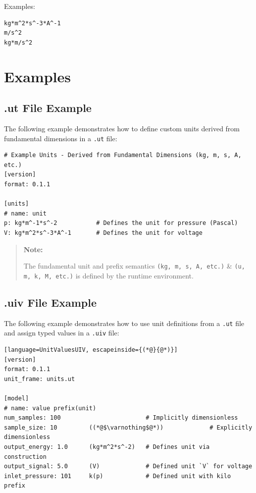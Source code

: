 \documentclass[11pt]{article}
\begin{document}
Examples:

\begin{lstlisting}[language=UnitValuesUT]
kg*m^2*s^-3*A^-1
m/s^2
kg*m/s^2
\end{lstlisting}

\section{Examples}

\subsection{.ut File Example}

The following example demonstrates how to define custom units derived from
fundamental dimensions in a \texttt{.ut} file:

\begin{lstlisting}[language=UnitValuesUT]
# Example Units - Derived from Fundamental Dimensions (kg, m, s, A, etc.)
[version]
format: 0.1.1
 
[units]
# name: unit
p: kg*m^-1*s^-2           # Defines the unit for pressure (Pascal)
V: kg*m^2*s^-3*A^-1       # Defines the unit for voltage
\end{lstlisting}

\begin{quote}
  \textbf{Note:}

  The fundamental unit and prefix semantics \texttt{(kg, m, s, A, etc.)}
  \& \texttt{(u, m, k, M, etc.)} is defined by the runtime environment.
\end{quote}

\subsection{.uiv File Example}

The following example demonstrates how to use unit definitions from a
\texttt{.ut} file and assign typed values in a \texttt{.uiv} file:

\begin{lstlisting}[language=UnitValuesUIV, escapeinside={(*@}{@*)}]
[version]
format: 0.1.1
unit_frame: units.ut

[model]
# name: value prefix(unit)
num_samples: 100                        # Implicitly dimensionless
sample_size: 10         ((*@$\varnothing$@*))             # Explicitly dimensionless
output_energy: 1.0      (kg*m^2*s^-2)   # Defines unit via construction
output_signal: 5.0      (V)             # Defined unit `V` for voltage
inlet_pressure: 101     k(p)            # Defined unit with kilo prefix
\end{lstlisting}
\end{document}

